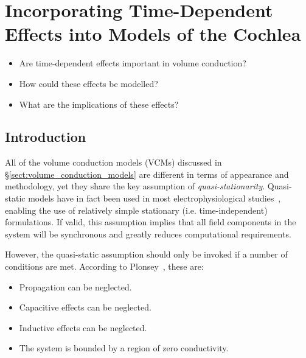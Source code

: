 	\pagestyle{fancy}
	\chead{}
	\rhead{{\sffamily \MakeUppercase\rightmark}}
	\lfoot{}
	\cfoot{{\sffamily \thepage}}
	\rfoot{}

\setstretchnormal

\chapter{Incorporating Time-Dependent Effects into Models of the Cochlea}
\label{sect:time_dependency}

\begin{center}
	\begin{tcolorbox}[title=\boxtitle]
		\begin{itemize}[leftmargin=*,labelindent=2ex,labelsep=1.5ex,itemsep=0pt,parsep=0pt]
			\item Are time-dependent effects important in volume conduction?
			\item How could these effects be modelled?
			\item What are the implications of these effects?
		\end{itemize}
	\end{tcolorbox}
\end{center}


\section{Introduction}

All of the volume conduction models (VCMs) discussed in
\S\ref{sect:volume_conduction_models} are different in terms of appearance and
methodology, yet they share the key assumption of \emph{quasi-stationarity}.
Quasi-static models have in fact been used in most electrophysiological
studies~\cite{plonsey1967}, enabling the use of relatively simple stationary
(i.e. time-independent) formulations. If valid, this assumption implies that all
field components in the system will be synchronous and greatly reduces
computational requirements.

However, the quasi-static assumption should only be invoked if a number of
conditions are met. According to Plonsey~\cite{plonsey1967}, these are:
\begin{itemize}[after=\vspace{1.5\medskipamount}]
    \item Propagation can be neglected.
    \item Capacitive effects can be neglected.
    \item Inductive effects can be neglected.
    \item The system is bounded by a region of zero conductivity.
\end{itemize}


